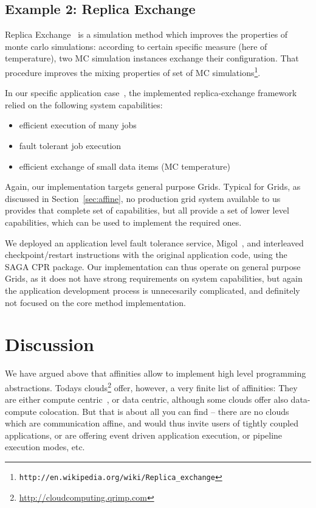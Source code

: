\documentclass{article}
\newenvironment{shortlist}{
  \vspace*{-0.5em}
  \begin{itemize}
  \setlength{\itemsep}{-0.3em}
}{
  \end{itemize}
  \vspace*{-0.5em}
}
\newcommand{\T}[1]{\texttt{#1}}
\begin{document}
 \subsection{Example 2: Replica Exchange}

  Replica Exchange~\cite{repex} is a simulation method which
  improves the properties of monte carlo simulations:  according
  to certain specific measure (here of temperature), two MC
  simulation instances exchange their configuration.  That
  procedure improves the mixing properties of set of MC
  simulations\footnote{\T{http://en.wikipedia.org/wiki/Replica\_exchange}}.

  In our specific application case~\cite{saga-migol-paper}, the
  implemented replica-exchange framework relied on the following
  system capabilities: 

  \begin{shortlist}
   \item efficient execution of many jobs
   \item fault tolerant job execution
   \item efficient exchange of small data items (MC temperature)
  \end{shortlist}

  Again, our implementation targets general purpose Grids.
  Typical for Grids, as discussed in Section~\ref{sec:affine},
  no production grid system available to us provides that
  complete set of capabilities, but all provide a set of lower
  level capabilities, which can be used to implement the
  required ones.

  We deployed an application level fault tolerance service,
  Migol~\cite{migol}, and interleaved checkpoint/restart
  instructions with the original application code, using the
  SAGA CPR package.  Our implementation can thus operate on
  general purpose Grids, as it does not have strong requirements
  on system capabilities, but again the application development
  process is unnecesarily complicated, and definitely not
  focused on the core method implementation.



\section{Discussion}
\label{sec:discussion}

  We have argued above that affinities allow to implement high
  level programming abstractions.  Todays
  clouds\footnote{\url{http://cloudcomputing.qrimp.com}} offer,
  however, a very finite list of affinities: They are either
  compute centric~\cite{EC2}, or data centric\cite{S3}, although
  some clouds offer also data-compute colocation.  But that is
  about all you can find -- there are no clouds which are
  communication affine, and would thus invite users of tightly
  coupled applications, or are offering event driven application
  execution, or pipeline execution modes, etc.
\end{document}
